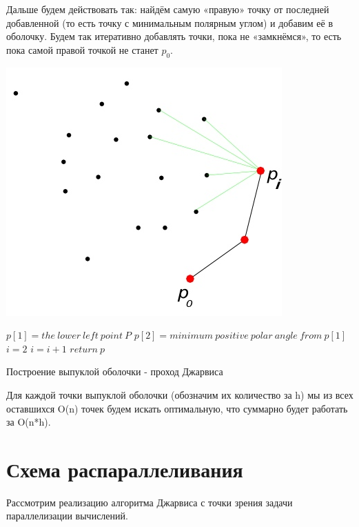 \documentclass{report}
\newenvironment{myalgorithm}[1][htb]
{\renewcommand{\algorithmcfname}{Алгоритм}
\begin{algorithm}[#1]%
}{\end{algorithm}}
\begin{document}
\par Дальше будем действовать так: найдём самую «правую» точку от последней добавленной (то есть точку с минимальным полярным углом) и добавим её в оболочку. Будем так итеративно добавлять точки, пока не «замкнёмся», то есть пока самой правой точкой не станет $p_{0}$.

\begin{center}
\captionsetup {type = figure}
\includegraphics[scale=0.75]{picture.png}
\vspace{1ex}
\end{center} 

\begin{myalgorithm}[H]
\SetAlgoLined
\BlankLine
$p[1] = the\:lower\:left\:point\:P$\;
$p[2] =minimum\:positive\:polar\:angle\:from\:p[1]$\;
$i = 2$\;
\BlankLine
{} {
$i = i + 1$\;
}
$return\:p$\;
\caption{Построение выпуклой оболочки - проход Джарвиса}
\end{myalgorithm}

\par Для каждой точки выпуклой оболочки (обозначим их количество за
h) мы из всех оставшихся O(n) точек будем искать оптимальную, что
суммарно будет работать за O(n*h).

\newpage

\section{Схема распараллеливания}
Рассмотрим реализацию алгоритма Джарвиса с точки зрения задачи параллелизации вычислений.
\end{document}
